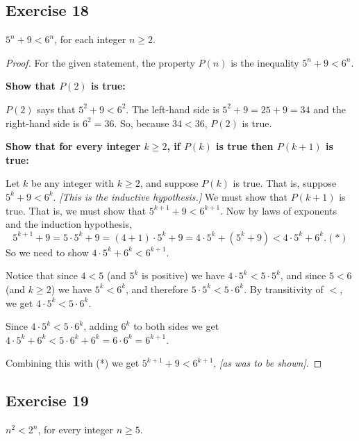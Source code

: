 \documentclass[14pt]{extarticle}
\begin{document}
\subsection{Exercise 18}
$5^n + 9 < 6^n$, for each integer $n \geq 2$.

\begin{proof}
    For the given statement, the property $P(n)$ is the inequality $5^n + 9 < 6^n$.

        {\bf Show that $P(2)$ is true:}

    $P(2)$ says that $5^2 + 9 < 6^2$. The left-hand side is $5^2 + 9 = 25 + 9 = 34$ and the right-hand side is $6^2 = 36$. So, because $34 < 36$, $P(2)$ is true.

        {\bf Show that for every integer $k \geq 2$, if $P(k)$ is true then $P(k + 1)$ is true:}

    Let $k$ be any integer with $k \geq 2$, and suppose $P(k)$ is true. That is, suppose $5^k + 9 < 6^k$. {\it [This is the inductive hypothesis.]} We must show that $P(k + 1)$ is true. That is, we must show that $5^{k+1} + 9 < 6^{k+1}$. Now by laws of exponents and the induction hypothesis,
    \[
        5^{k+1} + 9 = 5 \cdot 5^k + 9 = (4 + 1) \cdot 5^k + 9 = 4 \cdot 5^k + (5^k + 9) < 4 \cdot 5^k + 6^k. (*)
    \]
    So we need to show $4 \cdot 5^k + 6^k < 6^{k+1}$.

    Notice that since $4 < 5$ (and $5^k$ is positive) we have $4 \cdot 5^k < 5 \cdot 5^k$, and since $5 < 6$ (and $k \geq 2$) we have $5^k < 6^k$, and therefore $5 \cdot 5^k < 5 \cdot 6^k$. By transitivity of $<$, we get $4 \cdot 5^k < 5 \cdot 6^k$.

    Since $4 \cdot 5^k < 5 \cdot 6^k$, adding $6^k$ to both sides we get $4 \cdot 5^k + 6^k < 5 \cdot 6^k + 6^k = 6 \cdot 6^k = 6^{k+1}$.

    Combining this with (*) we get $5^{k+1} + 9 < 6^{k+1}$, {\it [as was to be shown]}.
\end{proof}

\subsection{Exercise 19}
$n^2 < 2^n$, for every integer $n \geq 5$.
\end{document}
